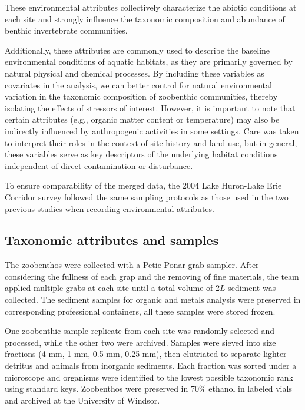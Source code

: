 \vspace{0.2em}
These environmental attributes collectively characterize the abiotic conditions at each site and strongly influence the taxonomic composition and abundance of benthic invertebrate communities.

Additionally, these attributes are commonly used to describe the baseline environmental conditions of aquatic habitats, as they are primarily governed by natural physical and chemical processes. 
By including these variables as covariates in the analysis, we can better control for natural
environmental variation in the taxonomic composition of zoobenthic communities, thereby
isolating the effects of stressors of interest. However, it is important to note 
that certain attributes (e.g., organic matter content or temperature) may also be
indirectly influenced by anthropogenic activities in some settings. 
Care was taken to interpret their roles in the context of site history and
land use, but in general, these variables serve as key descriptors of the 
underlying habitat conditions independent of direct contamination or disturbance.

To ensure comparability of the merged data, the 2004 Lake Huron-Lake Erie Corridor survey followed
the same sampling protocols as those used in the two previous studies when recording environmental attributes.

\subsection{Taxonomic attributes and samples}
The zoobenthos were collected with a Petie Ponar grab sampler. 
After considering the fullness of each grap and the removing of fine materials,
the team applied multiple grabs at each site until a total volume of 2\(L\) sediment was collected.
The sediment samples for organic and metals analysis were preserved in corresponding professional containers, 
all these samples were stored frozen.

One zoobenthic sample replicate from each site was randomly selected and processed, 
while the other two were archived. Samples were sieved into size fractions (4 mm, 1 mm, 0.5 mm, 0.25 mm), 
then elutriated to separate lighter detritus and animals from inorganic sediments. 
Each fraction was sorted under a microscope and organisms were identified to the lowest 
possible taxonomic rank using standard keys. Zoobenthos were preserved in 70\% ethanol in 
labeled vials and archived at the University of Windsor.

